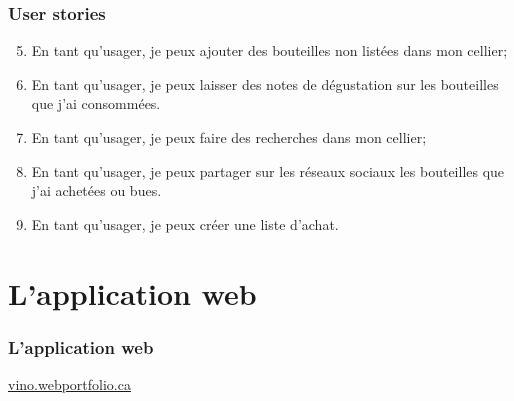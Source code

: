 \documentclass{beamer}
\begin{document}
\begin{frame}
\frametitle{User stories}
\begin{enumerate}
	\setcounter{enumi}{4}
	\item En tant qu’usager, je peux ajouter des bouteilles \og non listées \fg{} dans mon cellier;
	\item En tant qu’usager, je peux laisser des notes de dégustation sur les bouteilles que j’ai consommées.
	\item En tant qu’usager, je peux faire des recherches dans mon cellier;
	\item En tant qu’usager, je peux partager sur les réseaux sociaux les bouteilles que j’ai achetées ou bues.
	\item En tant qu’usager, je peux créer une liste d’achat.
\end{enumerate}
\end{frame}

\section{L’application web}
\begin{frame}
\frametitle{L’application web}
\href{http://vino.webportfolio.ca/}{vino.webportfolio.ca}
\end{frame}
\end{document}
